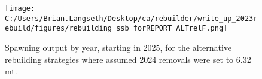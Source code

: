 \documentclass[11pt,
  letterpaper,
]{article}
\begin{document}
\begin{figure}
\centering
\texttt{[image: C:/Users/Brian.Langseth/Desktop/ca/rebuilder/write\_up\_2023rebuild/figures/rebuilding\_ssb\_forREPORT\_ALTrelF.png]}
\caption{Spawning output by year, starting in 2025, for the alternative rebuilding strategies where assumed 2024 removals were set to 6.32 mt.\label{fig:ssb-fig-alt}}
\end{figure}

\clearpage
\end{document}
